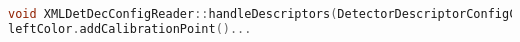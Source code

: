 \documentclass[preview,border=5]{standalone}
\begin{document}
\begin{lstlisting}[language=cpp,caption={Caption}]
void XMLDetDecConfigReader::handleDescriptors(DetectorDescriptorConfigContainer* configContainer, TiXmlNode* descriptorsNode);
leftColor.addCalibrationPoint()...
\end{lstlisting}
\end{document}
